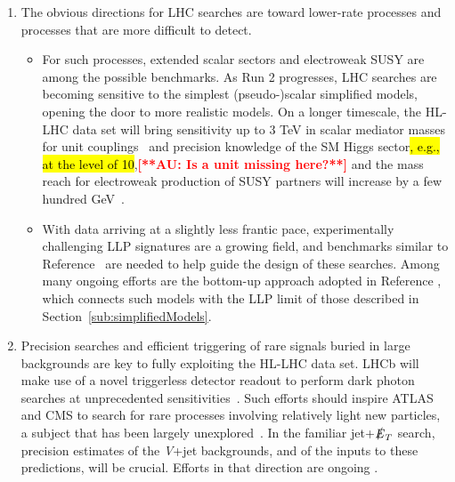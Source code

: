 \documentclass{ar-1col}
\newcommand{\MET}{\ensuremath{\slashed{E}_T}\xspace}
\begin{document}
\begin{issues}
\begin{enumerate}

\item The obvious directions for LHC searches are toward lower-rate
processes and processes that are more difficult to detect.

\begin{itemize}

\item For such processes, extended scalar sectors and electroweak SUSY
are among the possible benchmarks. As Run 2 progresses, LHC searches
are becoming sensitive to the simplest (pseudo-)scalar simplified
models, opening the door to more realistic models. On a longer
timescale, the HL-LHC data set will bring sensitivity up to 3
TeV in scalar mediator masses for unit
couplings~\cite{CMS-PAS-FTR-16-005} and precision knowledge of the
SM Higgs sector\hl{, e.g., at the level of 10},\textbf{\textcolor{red}{[**AU: Is a unit missing here?**]}} and the mass reach for
electroweak production of SUSY partners will increase by a few hundred
GeV~\cite{Campana:2016cqm}.

\item With data arriving at a slightly less frantic pace, experimentally
challenging LLP signatures are a growing field,
and benchmarks similar to Reference~ are
needed to help guide the design of these searches. Among many
ongoing efforts are the bottom-up approach adopted in
Reference , which connects such models with
the LLP limit of those described in
Section~\ref{sub:simplifiedModels}.

\end{itemize}

\item Precision searches and efficient triggering of rare signals buried
in large backgrounds are key to fully exploiting the HL-LHC data set.
LHCb will make use of a novel triggerless detector readout to
perform dark photon searches at unprecedented
sensitivities~\cite{Ilten:2016tkc}. Such efforts should
inspire ATLAS and CMS to search for rare processes involving
relatively light new particles, a subject that has been largely
unexplored~\cite{Alves:2016cqf}. In the familiar jet+\MET search,
precision estimates of the \textit{V}+jet backgrounds, and of the inputs to
these predictions, will be crucial. Efforts in that
direction are ongoing \cite{Blumenschein:2018gtm}.


\end{enumerate}
\end{issues}
\end{document}
